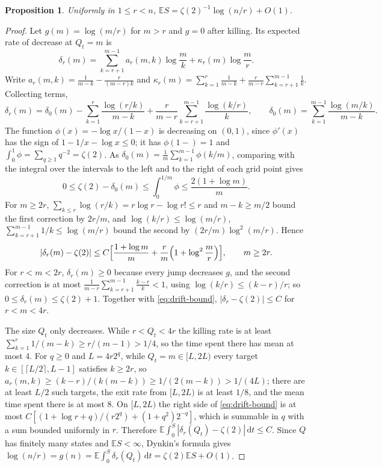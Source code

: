 \documentclass[11pt]{amsart}
\newtheorem{proposition}[theorem]{Proposition}
\theoremstyle{remark}
\numberwithin{equation}{section}
\newcommand{\E}{\mathbb E}
\newcommand{\dd}{\,\mathrm d}
\begin{document}
\begin{proposition}\label{prop:sep}
Uniformly in $1\le r<n$, $\E S=\zeta(2)^{-1}\log(n/r)+O(1)$.
\end{proposition}

\begin{proof}
Let $g(m)=\log(m/r)$ for $m>r$ and $g=0$ after killing. Its expected rate of decrease at $Q_t=m$ is
\[
\delta_r(m)=\sum_{k=r+1}^{m-1}a_r(m,k)\log\frac mk+\kappa_r(m)\log\frac mr .
\]
Write $a_r(m,k)=\frac1{m-k}-\frac r{(m-r)k}$ and $\kappa_r(m)=\sum_{k=1}^r\frac1{m-k}+\frac r{m-r}\sum_{k=r+1}^{m-1}\frac1k$. Collecting terms,
\begin{equation}\label{eq:drift2}
\delta_r(m)=\delta_0(m)-\sum_{k=1}^r\frac{\log(r/k)}{m-k}+\frac r{m-r}\sum_{k=r+1}^{m-1}\frac{\log(k/r)}k,\qquad \delta_0(m)=\sum_{k=1}^{m-1}\frac{\log(m/k)}{m-k}.
\end{equation}
The function $\phi(x)=-\log x/(1-x)$ is decreasing on $(0,1)$, since $\phi'(x)$ has the sign of $1-1/x-\log x\le0$; it has $\phi(1-)=1$ and $\int_0^1\phi=\sum_{q\ge1}q^{-2}=\zeta(2)$. As $\delta_0(m)=\frac1m\sum_{k=1}^{m-1}\phi(k/m)$, comparing with the integral over the intervals to the left and to the right of each grid point gives
\begin{equation}\label{eq:d0}
0\le\zeta(2)-\delta_0(m)\le\int_0^{1/m}\phi\le\frac{2(1+\log m)}m .
\end{equation}
For $m\ge2r$, $\sum_{k\le r}\log(r/k)=r\log r-\log r!\le r$ and $m-k\ge m/2$ bound the first correction by $2r/m$, and $\log(k/r)\le\log(m/r)$, $\sum_{k=r+1}^{m-1}1/k\le\log(m/r)$ bound the second by $(2r/m)\log^2(m/r)$. Hence
\begin{equation}\label{eq:drift-bound}
|\delta_r(m)-\zeta(2)|\le C\Bigl[\frac{1+\log m}m+\frac rm\Bigl(1+\log^2\frac mr\Bigr)\Bigr],\qquad m\ge2r.
\end{equation}
For $r<m<2r$, $\delta_r(m)\ge0$ because every jump decreases $g$, and the second correction is at most $\frac1{m-r}\sum_{k=r+1}^{m-1}\frac{k-r}k<1$, using $\log(k/r)\le(k-r)/r$; so $0\le\delta_r(m)\le\zeta(2)+1$. Together with \eqref{eq:drift-bound}, $|\delta_r-\zeta(2)|\le C$ for $r<m<4r$.

The size $Q_t$ only decreases. While $r<Q_t<4r$ the killing rate is at least $\sum_{k=1}^r1/(m-k)\ge r/(m-1)>1/4$, so the time spent there has mean at most $4$. For $q\ge0$ and $L=4r2^q$, while $Q_t=m\in[L,2L)$ every target $k\in[\lceil L/2\rceil,L-1]$ satisfies $k\ge2r$, so $a_r(m,k)\ge(k-r)/(k(m-k))\ge1/(2(m-k))>1/(4L)$; there are at least $L/2$ such targets, the exit rate from $[L,2L)$ is at least $1/8$, and the mean time spent there is at most $8$. On $[L,2L)$ the right side of \eqref{eq:drift-bound} is at most $C[(1+\log r+q)/(r2^q)+(1+q^2)2^{-q}]$, which is summable in $q$ with a sum bounded uniformly in $r$. Therefore $\E\int_0^S|\delta_r(Q_t)-\zeta(2)|\dd t\le C$. Since $Q$ has finitely many states and $\E S<\infty$, Dynkin's formula gives $\log(n/r)=g(n)=\E\int_0^S\delta_r(Q_t)\dd t=\zeta(2)\E S+O(1)$.
\end{proof}
\end{document}
